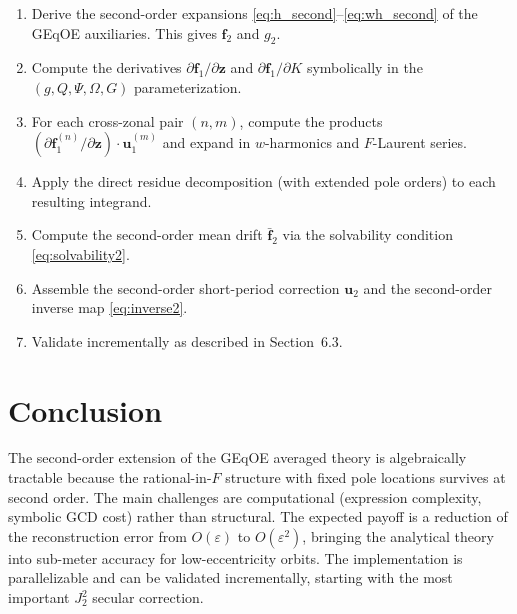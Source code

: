 \documentclass[11pt]{article}
\newcommand{\eps}{\varepsilon}
\begin{document}
\begin{enumerate}
\item Derive the second-order expansions \eqref{eq:h_second}--\eqref{eq:wh_second}
of the GEqOE auxiliaries. This gives $\bm f_2$ and $g_2$.

\item Compute the derivatives $\partial \bm f_1/\partial \bm z$ and
$\partial \bm f_1/\partial K$ symbolically in the $(g, Q, \Psi, \Omega, G)$
parameterization.

\item For each cross-zonal pair $(n, m)$, compute the products
$(\partial \bm f_1^{(n)}/\partial \bm z) \cdot \bm u_1^{(m)}$ and expand in
$w$-harmonics and $F$-Laurent series.

\item Apply the direct residue decomposition (with extended pole orders) to
each resulting integrand.

\item Compute the second-order mean drift $\bar{\bm f}_2$ via the
solvability condition \eqref{eq:solvability2}.

\item Assemble the second-order short-period correction $\bm u_2$ and the
second-order inverse map \eqref{eq:inverse2}.

\item Validate incrementally as described in Section~6.3.
\end{enumerate}


\section{Conclusion}

The second-order extension of the GEqOE averaged theory is algebraically
tractable because the rational-in-$F$ structure with fixed pole locations
survives at second order. The main challenges are computational (expression
complexity, symbolic GCD cost) rather than structural. The expected payoff is
a reduction of the reconstruction error from $O(\eps)$ to $O(\eps^2)$,
bringing the analytical theory into sub-meter accuracy for low-eccentricity
orbits. The implementation is parallelizable and can be validated
incrementally, starting with the most important $J_2^2$ secular correction.
\end{document}
